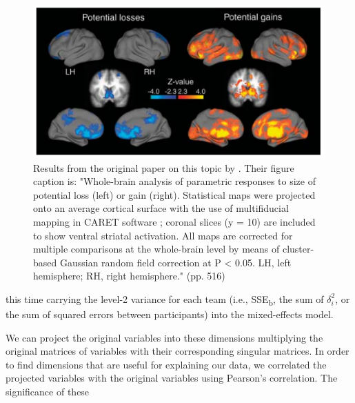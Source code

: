 \begin{figure}[!ht]
    \includegraphics[width=\textwidth]
    {figures/tom_fig2.png}
    \caption{\label{fig:orig_tom} Results from the original paper on this topic by \cite{tom_neural_2007}. Their figure caption is: "Whole-brain analysis of parametric responses to size of potential loss (left) or gain (right). Statistical maps were projected onto an average cortical surface with the use of multifiducial mapping in CARET software \citep{van2005population}; coronal slices (y = 10) are included to show ventral striatal activation. All maps are corrected for multiple comparisons at the whole-brain level by means of cluster-based Gaussian random field correction \citep{worsley1992three} at P < 0.05. LH, left hemisphere; RH, right hemisphere." (pp. 516)}
\end{figure}



 this time carrying the level-2 variance for each team (i.e., SSE\textsubscript{b}, the sum of $\delta_{i}^2$, or the sum of squared errors between participants) into the mixed-effects model. 
 
 
 We can project the original variables into these dimensions multiplying the original matrices of variables with their corresponding singular matrices. In order to find dimensions that are useful for explaining our data, we correlated the projected variables with the original variables using Pearson's correlation. The significance of these 

